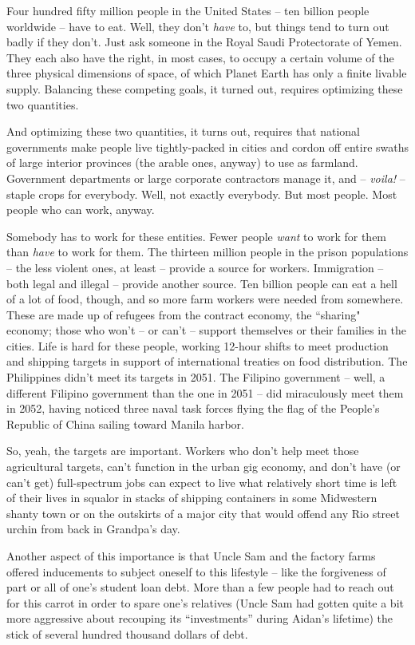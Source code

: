 \documentclass[11pt]{book}
\begin{document}
	Four hundred fifty million people in the United States -- ten billion people worldwide -- have to eat. Well, they don't \textit{have} to, but things tend to turn out badly if they don't. Just ask someone in the Royal Saudi Protectorate of Yemen. They each also have the right, in most cases, to occupy a certain volume of the three physical dimensions of space, of which Planet Earth has only a finite livable supply. Balancing these competing goals, it turned out, requires optimizing these two quantities.
	
	And optimizing these two quantities, it turns out, requires that national governments make people live tightly-packed in cities and cordon off entire swaths of large interior provinces (the arable ones, anyway) to use as farmland. Government departments or large corporate contractors manage it, and -- \textit{voila!} -- staple crops for everybody. Well, not exactly everybody. But most people. Most people who can work, anyway.
	
	Somebody has to work for these entities. Fewer people \textit{want} to work for them than \textit{have} to work for them. The thirteen million people in the prison populations -- the less violent ones, at least -- provide a source for workers. Immigration -- both legal and illegal -- provide another source. Ten billion people can eat a hell of a lot of food, though, and so more farm workers were needed from somewhere. These are made up of refugees from the contract economy, the ``sharing" economy; those who won't -- or can't -- support themselves or their families in the cities. Life is hard for these people, working 12-hour shifts to meet production and shipping targets in support of international treaties on food distribution. The Philippines didn't meet its targets in 2051. The Filipino government -- well, a different Filipino government than the one in 2051 -- did miraculously meet them in 2052, having noticed three naval task forces flying the flag of the People's Republic of China sailing toward Manila harbor.
	
	So, yeah, the targets are important. Workers who don't help meet those agricultural targets, can't function in the urban gig economy, and don't have (or can't get) full-spectrum jobs can expect to live what relatively short time is left of their lives in squalor in stacks of shipping containers in some Midwestern shanty town or on the outskirts of a major city that would offend any Rio street urchin from back in Grandpa's day.
	
	Another aspect of this importance is that Uncle Sam and the factory farms offered inducements to subject oneself to this lifestyle -- like the forgiveness of part or all of one's student loan debt. More than a few people had to reach out for this carrot in order to spare one's relatives (Uncle Sam had gotten quite a bit more aggressive about recouping its ``investments'' during Aidan's lifetime) the stick of several hundred thousand dollars of debt. 
	
\end{document}
